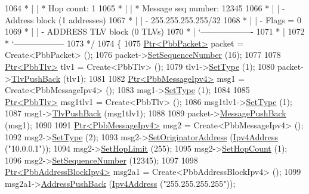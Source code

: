 \begin{DoxyCode}
1064 \textcolor{comment}{         * |    | * Hop count:          1}
1065 \textcolor{comment}{         * |    | * Message seq number: 12345}
1066 \textcolor{comment}{         * |    | - Address block (1 addresses)}
1067 \textcolor{comment}{         * |    |     - 255.255.255.255/32}
1068 \textcolor{comment}{         * |    |     - Flags = 0}
1069 \textcolor{comment}{         * |    | - ADDRESS TLV block (0 TLVs)}
1070 \textcolor{comment}{         * |    `-------------------}
1071 \textcolor{comment}{         * |}
1072 \textcolor{comment}{         * `------------------}
1073 \textcolor{comment}{   */}
1074   \{
1075     \hyperlink{classns3_1_1Ptr}{Ptr<PbbPacket>} packet = Create<PbbPacket> ();
1076     packet->\hyperlink{classns3_1_1PbbPacket_a7d6a1602be86109760d0f26ff9bbbb8e}{SetSequenceNumber} (16);
1077 
1078     \hyperlink{classns3_1_1Ptr}{Ptr<PbbTlv>} tlv1 = Create<PbbTlv> ();
1079     tlv1->\hyperlink{classns3_1_1PbbTlv_a90a0452018ed364ac37c3ad116dd718b}{SetType} (1);
1080     packet->\hyperlink{classns3_1_1PbbPacket_a34935793e729a106c176db99c969cb42}{TlvPushBack} (tlv1);
1081 
1082     \hyperlink{classns3_1_1Ptr}{Ptr<PbbMessageIpv4>} msg1 = Create<PbbMessageIpv4> ();
1083     msg1->\hyperlink{classns3_1_1PbbMessage_a4b3d1eaabd3e7412a46ac79bf3360dac}{SetType} (1);
1084 
1085     \hyperlink{classns3_1_1Ptr}{Ptr<PbbTlv>} msg1tlv1 = Create<PbbTlv> ();
1086     msg1tlv1->\hyperlink{classns3_1_1PbbTlv_a90a0452018ed364ac37c3ad116dd718b}{SetType} (1);
1087     msg1->\hyperlink{classns3_1_1PbbMessage_aac70b2672f79765cf5cc5b6666018165}{TlvPushBack} (msg1tlv1);
1088 
1089     packet->\hyperlink{classns3_1_1PbbPacket_a4a3170001ef758d9c9c4375b8f089826}{MessagePushBack} (msg1);
1090 
1091     \hyperlink{classns3_1_1Ptr}{Ptr<PbbMessageIpv4>} msg2 = Create<PbbMessageIpv4> ();
1092     msg2->\hyperlink{classns3_1_1PbbMessage_a4b3d1eaabd3e7412a46ac79bf3360dac}{SetType} (2);
1093     msg2->\hyperlink{classns3_1_1PbbMessage_a52ac135a2bec53db5e8f46b8b8a25e7c}{SetOriginatorAddress} (\hyperlink{classns3_1_1Ipv4Address}{Ipv4Address} (\textcolor{stringliteral}{"10.0.0.1"}));
1094     msg2->\hyperlink{classns3_1_1PbbMessage_a532a7e5e135f7491f8a84ab1dfadd28f}{SetHopLimit} (255);
1095     msg2->\hyperlink{classns3_1_1PbbMessage_a882ec7e2e9a9dff6297152c196d54ce4}{SetHopCount} (1);
1096     msg2->\hyperlink{classns3_1_1PbbMessage_a8c24696ac67507afa03c9750daccc47d}{SetSequenceNumber} (12345);
1097 
1098     \hyperlink{classns3_1_1Ptr}{Ptr<PbbAddressBlockIpv4>} msg2a1 = Create<PbbAddressBlockIpv4> ();
1099     msg2a1->\hyperlink{classns3_1_1PbbAddressBlock_a7be545a53d69bd426dbebcf752ed8371}{AddressPushBack} (\hyperlink{classns3_1_1Ipv4Address}{Ipv4Address} (\textcolor{stringliteral}{"255.255.255.255"}));

\end{DoxyCode}
